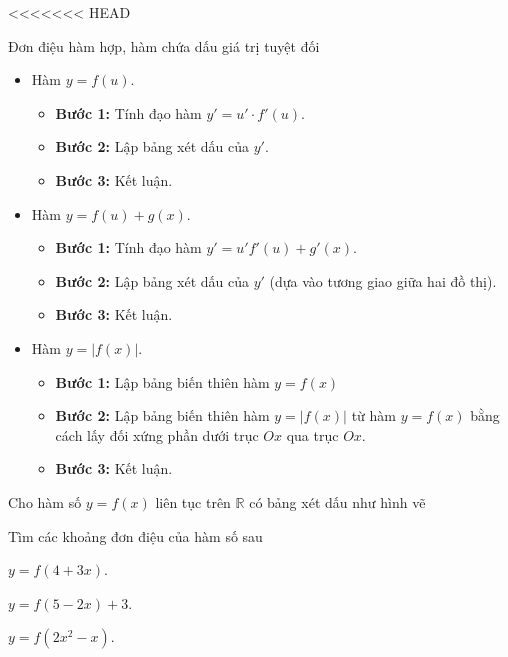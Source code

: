 <<<<<<< HEAD
\begin{dang}{Đơn điệu hàm hợp, hàm chứa dấu giá trị tuyệt đối}
    \begin{itemize}
        \item Hàm $y=f(u)$.
        \begin{itemize}
            \item \textbf{Bước 1:} Tính đạo hàm $y'=u'\cdot f'(u)$.
            \item \textbf{Bước 2:} Lập bảng xét dấu của $y'$.
            \item \textbf{Bước 3:} Kết luận.
        \end{itemize}
        \item Hàm $y=f(u)+g(x)$.
        \begin{itemize}
            \item \textbf{Bước 1:} Tính đạo hàm $y'=u'f'(u)+g'(x)$.
            \item \textbf{Bước 2:} Lập bảng xét dấu của $y'$ (dựa vào tương giao giữa hai đồ thị).
            \item \textbf{Bước 3:} Kết luận.
        \end{itemize}
        \item Hàm $y=|f(x)|$.
        \begin{itemize}
            \item \textbf{Bước 1:} Lập bảng biến thiên hàm $y=f(x)$
            \item \textbf{Bước 2:} Lập bảng biến thiên hàm $y=|f(x)|$ từ hàm $y=f(x)$ bằng cách lấy đối xứng phần dưới trục $Ox$ qua trục $Ox$.
            \item \textbf{Bước 3:} Kết luận.
        \end{itemize}
    \end{itemize}
\end{dang}
\begin{vd}%
    Cho hàm số $y=f(x)$ liên tục trên $\mathbb{R}$ có bảng xét dấu như hình vẽ
    \begin{center}
    \end{center}
    Tìm các khoảng đơn điệu của hàm số sau
    \begin{listEX}[3]
        \item $y=f(4+3x)$.
        \item $y=f(5-2x)+3$.
        \item $y=f(2x^2-x)$.
    \end{listEX}
\end{vd}
